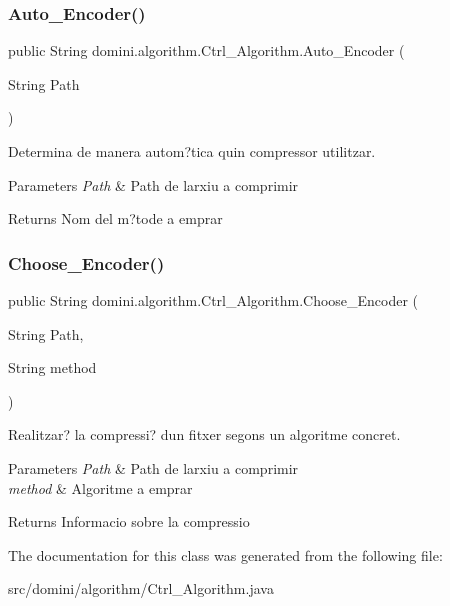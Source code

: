 \subsubsection{\texorpdfstring{Auto\+\_\+\+Encoder()}{Auto\_Encoder()}}
{\footnotesize\ttfamily public String domini.\+algorithm.\+Ctrl\+\_\+\+Algorithm.\+Auto\+\_\+\+Encoder (\begin{DoxyParamCaption}\item[{String}]{Path }\end{DoxyParamCaption})\hspace{0.3cm}{\ttfamily [inline]}}



Determina de manera autom?tica quin compressor utilitzar. 


\begin{DoxyParams}{Parameters}
{\em Path} & Path de l\textquotesingle{}arxiu a comprimir \\
\hline
\end{DoxyParams}
\begin{DoxyReturn}{Returns}
Nom del m?tode a emprar 
\end{DoxyReturn}
\mbox{\label{classdomini_1_1algorithm_1_1Ctrl__Algorithm_a5af3b3afa4465c95093532396cecb8c7}} 
\subsubsection{\texorpdfstring{Choose\+\_\+\+Encoder()}{Choose\_Encoder()}}
{\footnotesize\ttfamily public String domini.\+algorithm.\+Ctrl\+\_\+\+Algorithm.\+Choose\+\_\+\+Encoder (\begin{DoxyParamCaption}\item[{String}]{Path,  }\item[{String}]{method }\end{DoxyParamCaption})\hspace{0.3cm}{\ttfamily [inline]}}



Realitzar? la compressi? d\textquotesingle{}un fitxer segons un algoritme concret. 


\begin{DoxyParams}{Parameters}
{\em Path} & Path de l\textquotesingle{}arxiu a comprimir \\
\hline
{\em method} & Algoritme a emprar \\
\hline
\end{DoxyParams}
\begin{DoxyReturn}{Returns}
Informacio sobre la compressio 
\end{DoxyReturn}


The documentation for this class was generated from the following file\+:\begin{DoxyCompactItemize}
\item 
src/domini/algorithm/Ctrl\+\_\+\+Algorithm.\+java\end{DoxyCompactItemize}
